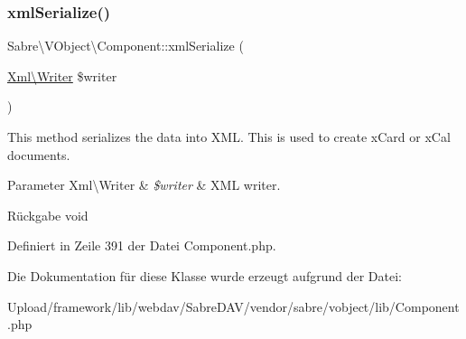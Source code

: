 \subsubsection{\texorpdfstring{xml\+Serialize()}{xmlSerialize()}}
{\footnotesize\ttfamily Sabre\textbackslash{}\+V\+Object\textbackslash{}\+Component\+::xml\+Serialize (\begin{DoxyParamCaption}\item[{\mbox{\hyperlink{class_sabre_1_1_xml_1_1_writer}{Xml\textbackslash{}\+Writer}}}]{\$writer }\end{DoxyParamCaption})}

This method serializes the data into X\+ML. This is used to create x\+Card or x\+Cal documents.


\begin{DoxyParams}[1]{Parameter}
Xml\textbackslash{}\+Writer & {\em \$writer} & X\+ML writer.\\
\hline
\end{DoxyParams}
\begin{DoxyReturn}{Rückgabe}
void 
\end{DoxyReturn}


Definiert in Zeile 391 der Datei Component.\+php.



Die Dokumentation für diese Klasse wurde erzeugt aufgrund der Datei\+:\begin{DoxyCompactItemize}
\item 
Upload/framework/lib/webdav/\+Sabre\+D\+A\+V/vendor/sabre/vobject/lib/Component.\+php\end{DoxyCompactItemize}
